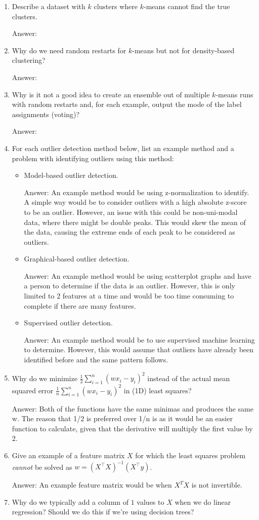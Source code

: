 \documentclass{article}
\def\ans#1{\par\gre{Answer: #1}}
\def\gre#1{{\color{gre}#1}}
\begin{document}
\begin{enumerate}
\item Describe a dataset with $k$ clusters where $k$-means cannot find the true clusters.
\ans{}
\item Why do we need random restarts for $k$-means but not for density-based clustering?
\ans{}
\item Why is it not a good idea to create an ensemble out of multiple $k$-means runs with random restarts and, for each example, output the mode of the label assignments (voting)?
\ans{}
\item For each outlier detection method below, list an example method and a problem with identifying outliers using this method:
\begin{itemize}
\item Model-based outlier detection.
\ans{An example method would be using z-normalization to identify. A simple way would be to consider outliers with a high absolute z-score to be an outlier. However, an issue with this could be non-uni-modal data, where there might be double peaks. This would skew the mean of the data, causing the extreme ends of each peak to be considered as outliers.}
\item Graphical-based outlier detection.
\ans{An example method would be using scatterplot graphs and have a person to determine if the data is an outlier. However, this is only limited to 2 features at a time and would be too time consuming to complete if there are many features.}
\item Supervised outlier detection.
\ans{An example method would be to use supervised machine learning to determine. However, this would assume that outliers have already been identified before and the same pattern follows.}
\end{itemize}
\item Why do we minimize $\frac{1}{2}\sum_{i=1} ^n (wx_i-y_i)^2$ instead of the actual mean squared error $\frac{1}{n}\sum_{i=1}^n (wx_i-y_i)^2$ in (1D) least squares?
\ans{Both of the functions have the same minimas and produces the same w. The reason that 1/2 is preferred over 1/n is as it would be an easier function to calculate, given that the derivative will multiply the first value by 2.}
\item Give an example of a feature matrix $X$ for which the least squares problem \emph{cannot} be solved as $w = (X^\top X)^{-1}(X^\top y)$.
\ans{An example feature matrix would be when $X^T X$ is not invertible.}
\item Why do we typically add a column of $1$ values to $X$ when we do linear regression? Should we do this if we're using decision trees?

\end{enumerate}
\end{document}
